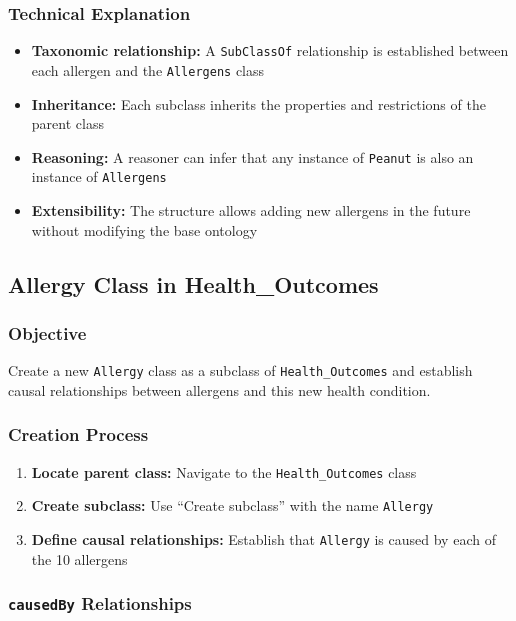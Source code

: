 \documentclass[12pt,a4paper]{article}
\begin{document}
\subsubsection{Technical Explanation}

\begin{itemize}
    \item \textbf{Taxonomic relationship:} A \texttt{SubClassOf} relationship is established between each allergen and the \texttt{Allergens} class
    \item \textbf{Inheritance:} Each subclass inherits the properties and restrictions of the parent class
    \item \textbf{Reasoning:} A reasoner can infer that any instance of \texttt{Peanut} is also an instance of \texttt{Allergens}
    \item \textbf{Extensibility:} The structure allows adding new allergens in the future without modifying the base ontology
\end{itemize}

\subsection{Allergy Class in Health\_Outcomes}

\subsubsection{Objective}

Create a new \texttt{Allergy} class as a subclass of \texttt{Health\_Outcomes} and establish causal relationships between allergens and this new health condition.

\subsubsection{Creation Process}

\begin{enumerate}
    \item \textbf{Locate parent class:} Navigate to the \texttt{Health\_Outcomes} class
    \item \textbf{Create subclass:} Use ``Create subclass'' with the name \texttt{Allergy}
    \item \textbf{Define causal relationships:} Establish that \texttt{Allergy} is caused by each of the 10 allergens
\end{enumerate}

\subsubsection{\texttt{causedBy} Relationships}
\end{document}
